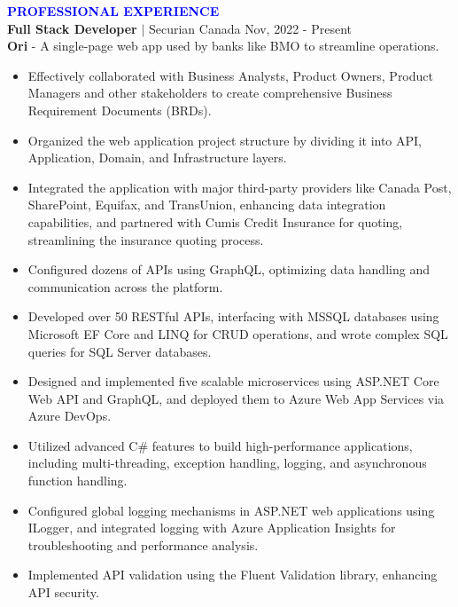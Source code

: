 \documentclass{article}
\newcommand{\fontMediumBold}[1]{{\fontsize{15}{18}\selectfont\bfseries #1}}
\begin{document}
\vspace{10pt}
  \fontMediumBold{\texorpdfstring{\textcolor{blue}{PROFESSIONAL EXPERIENCE \textcolor{blue}{\hrulefill}}}{PROFESSIONAL EXPERIENCE}}
\vspace{5pt}\\
\textbf{Full Stack Developer} $|$ Securian Canada \hfill {Nov, 2022 - Present}\\
\textbf{Ori} - A single-page web app used by banks like BMO to streamline operations.
\vspace{-5pt}
\begin{itemize}[leftmargin=15pt, itemsep=-5pt]
  \item Effectively collaborated with Business Analysts, Product Owners, Product Managers and other stakeholders to create comprehensive Business Requirement Documents (BRDs).
  \item Organized the web application project structure by dividing it into API, Application, Domain, and Infrastructure layers.
  \item Integrated the application with major third-party providers like Canada Post, SharePoint, Equifax, and TransUnion, enhancing data integration capabilities, and partnered with Cumis Credit Insurance for quoting, streamlining the insurance quoting process.
  \item Configured dozens of APIs using GraphQL, optimizing data handling and communication across the platform.
  \item Developed over 50 RESTful APIs, interfacing with MSSQL databases using Microsoft EF Core and LINQ for CRUD operations, and wrote complex SQL queries for SQL Server databases.
  \item Designed and implemented five scalable microservices using ASP.NET Core Web API and GraphQL, and deployed them to Azure Web App Services via Azure DevOps.
  \item Utilized advanced C\# features to build high-performance applications, including multi-threading, exception handling, logging, and asynchronous function handling.
  \item Configured global logging mechanisms in ASP.NET web applications using ILogger, and integrated logging with Azure Application Insights for troubleshooting and performance analysis.
  \item Implemented API validation using the Fluent Validation library, enhancing API security.

\end{itemize}
\end{document}
